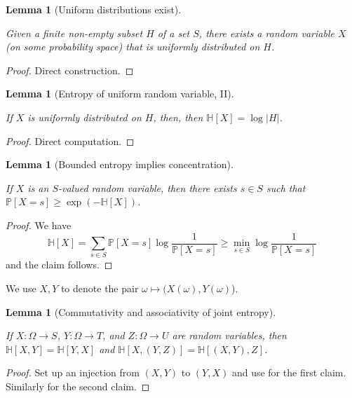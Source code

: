 \documentclass[10pt,a4paper]{article}
\newtheorem{lemma}[theorem]{Lemma}
\newcommand{\lean}[1]{}
\newcommand{\uses}[1]{}
\newcommand{\leanok}{}
\newcommand{\bbH}{\mathbb{H}}
\newcommand{\bbP}{\mathbb{P}}
\begin{document}
\begin{lemma}[Uniform distributions exist]\label{unif-exist}
  \uses{uniform-def}
  \lean{ProbabilityTheory.exists_isUniform, ProbabilityTheory.exists_isUniform_measureSpace}\leanok
  Given a finite non-empty subset $H$ of a set $S$, there exists a random variable $X$ (on some probability space) that is uniformly distributed on $H$.
\end{lemma}

\begin{proof}\leanok Direct construction.
\end{proof}


\begin{lemma}[Entropy of uniform random variable, II]\label{uniform-entropy-II}
  \uses{entropy-def, uniform-def}
  \lean{ProbabilityTheory.IsUniform.entropy_eq}\leanok
  If $X$ is uniformly distributed on $H$, then, then $\bbH[X] = \log |H|$.
\end{lemma}

\begin{proof}\leanok Direct computation.
\end{proof}

\begin{lemma}[Bounded entropy implies concentration]\label{bound-conc}
  \uses{entropy-def}
  \lean{ProbabilityTheory.prob_ge_exp_neg_entropy}\leanok
  If $X$ is an $S$-valued random variable, then there exists $s \in S$ such that $\bbP[X=s] \geq \exp(-\bbH[X])$.
\end{lemma}

\begin{proof}
  \leanok
  We have
  $$ \bbH[X] = \sum_{s \in S} \bbP[X=s] \log \frac{1}{\bbP[X=s]} \geq \min_{s \in S} \log \frac{1}{\bbP[X=s]}$$
  and the claim follows.
\end{proof}

We use $X,Y$ to denote the pair $\omega \mapsto (X(\omega),Y(\omega)$).

\begin{lemma}[Commutativity and associativity of joint entropy]
  \label{entropy-comm}
  \lean{ProbabilityTheory.entropy_comm, ProbabilityTheory.entropy_assoc}
  \leanok
  If $X: \Omega \to S$, $Y: \Omega \to T$, and $Z: \Omega \to U$ are random variables, then $\bbH[X, Y] = \bbH[Y, X]$ and $\bbH[X, (Y,Z)] = \bbH[(X,Y), Z]$.
\end{lemma}
\begin{proof}
  \leanok
  \uses{relabeled-entropy}
  Set up an injection from $(X,Y)$ to $(Y,X)$ and use  for the first claim. Similarly for the second claim.
\end{proof}
\end{document}
